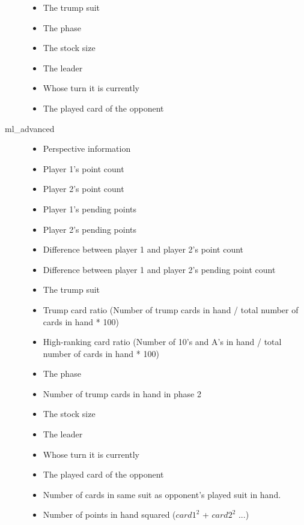 \documentclass[a4paper,11pt]{article}
\begin{document}
\begin{description}
\begin{itemize}
\item The trump suit
\item The phase
\item The stock size
\item The leader
\item Whose turn it is currently
\item The played card of the opponent
\end{itemize}
\item[ml\_advanced] \hfill
\begin{itemize}
\item Perspective information
\item Player 1's point count
\item Player 2's point count
\item Player 1's pending points
\item Player 2's pending points
\item Difference between player 1 and player 2's point count
\item Difference between player 1 and player 2's pending point count
\item The trump suit
\item Trump card ratio (Number of trump cards in hand / total number of cards in hand * 100)
\item High-ranking card ratio (Number of 10's and A's in hand / total number of cards in hand * 100)
\item The phase
\item Number of trump cards in hand in phase 2
\item The stock size
\item The leader
\item Whose turn it is currently
\item The played card of the opponent
\item Number of cards in same suit as opponent's played suit in hand.
\item Number of points in hand squared ($card1^2$ + $card2^2$ ...)
\end{itemize}


\end{description}
\end{document}
